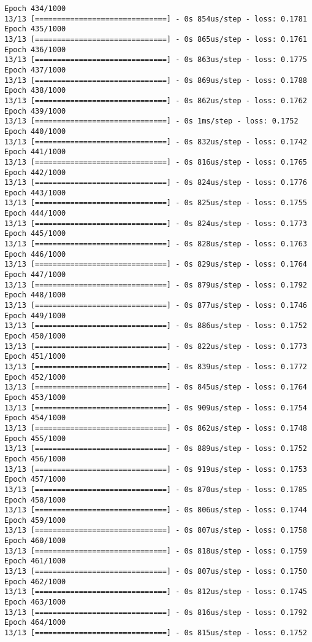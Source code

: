 \documentclass[11pt]{article}
\begin{document}
\begin{Verbatim}[commandchars=\\\{\}]
Epoch 434/1000
13/13 [==============================] - 0s 854us/step - loss: 0.1781
Epoch 435/1000
13/13 [==============================] - 0s 865us/step - loss: 0.1761
Epoch 436/1000
13/13 [==============================] - 0s 863us/step - loss: 0.1775
Epoch 437/1000
13/13 [==============================] - 0s 869us/step - loss: 0.1788
Epoch 438/1000
13/13 [==============================] - 0s 862us/step - loss: 0.1762
Epoch 439/1000
13/13 [==============================] - 0s 1ms/step - loss: 0.1752
Epoch 440/1000
13/13 [==============================] - 0s 832us/step - loss: 0.1742
Epoch 441/1000
13/13 [==============================] - 0s 816us/step - loss: 0.1765
Epoch 442/1000
13/13 [==============================] - 0s 824us/step - loss: 0.1776
Epoch 443/1000
13/13 [==============================] - 0s 825us/step - loss: 0.1755
Epoch 444/1000
13/13 [==============================] - 0s 824us/step - loss: 0.1773
Epoch 445/1000
13/13 [==============================] - 0s 828us/step - loss: 0.1763
Epoch 446/1000
13/13 [==============================] - 0s 829us/step - loss: 0.1764
Epoch 447/1000
13/13 [==============================] - 0s 879us/step - loss: 0.1792
Epoch 448/1000
13/13 [==============================] - 0s 877us/step - loss: 0.1746
Epoch 449/1000
13/13 [==============================] - 0s 886us/step - loss: 0.1752
Epoch 450/1000
13/13 [==============================] - 0s 822us/step - loss: 0.1773
Epoch 451/1000
13/13 [==============================] - 0s 839us/step - loss: 0.1772
Epoch 452/1000
13/13 [==============================] - 0s 845us/step - loss: 0.1764
Epoch 453/1000
13/13 [==============================] - 0s 909us/step - loss: 0.1754
Epoch 454/1000
13/13 [==============================] - 0s 862us/step - loss: 0.1748
Epoch 455/1000
13/13 [==============================] - 0s 889us/step - loss: 0.1752
Epoch 456/1000
13/13 [==============================] - 0s 919us/step - loss: 0.1753
Epoch 457/1000
13/13 [==============================] - 0s 870us/step - loss: 0.1785
Epoch 458/1000
13/13 [==============================] - 0s 806us/step - loss: 0.1744
Epoch 459/1000
13/13 [==============================] - 0s 807us/step - loss: 0.1758
Epoch 460/1000
13/13 [==============================] - 0s 818us/step - loss: 0.1759
Epoch 461/1000
13/13 [==============================] - 0s 807us/step - loss: 0.1750
Epoch 462/1000
13/13 [==============================] - 0s 812us/step - loss: 0.1745
Epoch 463/1000
13/13 [==============================] - 0s 816us/step - loss: 0.1792
Epoch 464/1000
13/13 [==============================] - 0s 815us/step - loss: 0.1752

\end{Verbatim}
\end{document}
